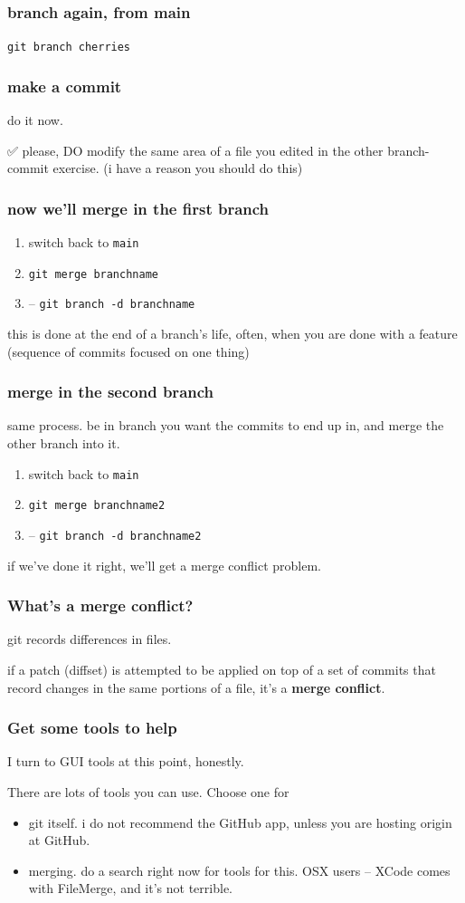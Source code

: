 \documentclass[14pt,aspectratio=1610]{beamer} %
\newcommand{\fframe}[2]{
   \begin{frame}
\frametitle{#1}
#2
\end{frame}
}
\begin{document}
\fframe{branch again, from main}
{
	{\tt git branch cherries}
}


\fframe{make a commit}
{
do it now.


\vspace{\baselineskip}

✅
please, DO modify the same area of a file you edited in the other branch-commit exercise.  (i have a reason you should do this)

}


\fframe{now we'll merge in the first branch}
{
	\begin{enumerate}
		\item switch back to {\tt main}
		\item {\tt git merge  branchname}
		\item [optional] -- {\tt git branch -d branchname}
	\end{enumerate}

\vspace{\baselineskip}

	this is done at the end of a branch's life, often, when you are done with a feature (sequence of commits focused on one thing)
}

\fframe{merge in the second branch}
{
	same process.  be in branch you want the commits to end up in, and merge the other branch into it.

\vspace{\baselineskip}

		\begin{enumerate}
		\item switch back to {\tt main}
		\item {\tt git merge  branchname2}
		\item [optional] -- {\tt git branch -d branchname2}
	\end{enumerate}

	if we've done it right, we'll get a merge conflict problem.
}




\fframe{What's a merge conflict?}
{
	git records differences in files.

	if a patch (diffset) is attempted to be applied on top of a set of commits that record changes in the same portions of a file, it's a {\bf merge conflict}.

}

\fframe{Get some tools to help}
{
	I turn to GUI tools at this point, honestly.

	There are lots of tools you can use.  Choose one for
	\begin{itemize}
		\item git itself.  i do not recommend the GitHub app, unless you are hosting origin at GitHub.
		\item merging.  do a search right now for tools for this.
		OSX users -- XCode comes with FileMerge, and it's not terrible.
		\end{itemize}


}
\end{document}
